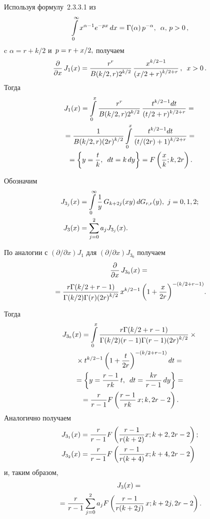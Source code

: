 \begin{multicols}{2}
Используя формулу~2.3.3.1 из~\cite[с.~259]{Prudnikov}
\begin{equation*}
\int\limits^{\infty}_{0} x^{\alpha-1}e^{-px}\,dx=
\Gamma(\alpha)\,p^{-\alpha}, \enskip
\alpha,\,p > 0\,,
\end{equation*}
c $\alpha=r+k/2$ и~$p\hm=r\hm+x/2,$ получаем
\begin{equation*}
\fr{\partial}{\partial x}\,J_1(x) = \fr{r^r}{B(k/2,r)2^{k/2}}\,
\fr{x^{k/2-1}}{(x/2+r)^{k/2+r}}\,, \enskip x>0\,.
\end{equation*}
Тогда
\begin{multline}
\label{int1}
J_1(x) = \int\limits_{0}^{x} \fr{r^r}{B(k/2,r)2^{k/2}}\,
\fr{t^{k/2-1}dt}{(t/2+r)^{k/2+r}}  ={}\\
{}= \fr{1}{B(k/2,r)(2r)^{k/2}}  
\int\limits_{0}^{x}\fr{t^{k/2-1}dt}{(t/(2r)+1)^{k/2+r}} = {}\\
{}= \left\{  y = \fr{t}{k}, \enskip dt = k\,dy  \right\} = 
F\left(\fr{x}{k};k,2r\right).
\end{multline}


Обозначим
\begin{align*}
 J_{3_j}(x) &= \int\limits^{\infty}_{0} \fr{1}{y}\,G_{k+2j}(xy)\,dG_{r,r}(y), \
  j = 0,1,2; \\
   J_3(x)&= \sum\limits_{j=0}^{2} a_j  J_{3_j}(x).
 \end{align*}

По аналогии с $({\partial}/{\partial x})J_{1}$ для $({\partial}/{\partial x})J_{3_0}$ получаем
\begin{multline*}
\fr{\partial}{\partial x}\,J_{3_0}(x) = {}\\
{}=
\fr{r \Gamma(k/2+r-1)}{\Gamma(k/2) 
\Gamma(r) (2r)^{k/2}}\,x^{k/2-1}\left(1+\fr{x}{2r}\right)^{-(k/2+r-1)}\!.
\end{multline*}

Тогда
\begin{multline*}
J_{3_0}(x) =\int\limits_{0}^{x} \fr{r \Gamma(k/2+r-1)}{\Gamma(k/2) 
(r-1)\Gamma(r-1) (2r)^{k/2}}\times{}\\
{}\times t^{k/2-1}\left(1+\fr{t}{2r}\right)^{-(k/2+r-1)}dt ={}\\
{}= \left\{  y = \fr{r-1}{rk}\,t, \enskip dt = \fr{kr}{r-1}\,dy  \right\} = {}\\
{}=
\fr{r}{r-1} F\left( \fr{r-1}{rk} \,x;k,2r-2\right).
\end{multline*}
Аналогично получаем
\begin{align*}
J_{3_1}(x)&=\fr{r}{r-1} F\left( \fr{r-1}{r(k+2)} x;k+2,2r-2\right);  \\
J_{3_2}(x)&=\fr{r}{r-1} F\left( \fr{r-1}{r(k+4)}x;k+4,2r-2\right)
\end{align*}
и, таким образом,
\begin{multline}
J_3(x)={}\\
\!\!{}=\fr{r}{r-1}  \sum\limits_{j=0}^{2} a_j  F\left( \fr{r-1}{r(k+2j)} \,x;k+2j,2r-2\right).\!\!
\label{int3}
\end{multline}



\end{multicols}
